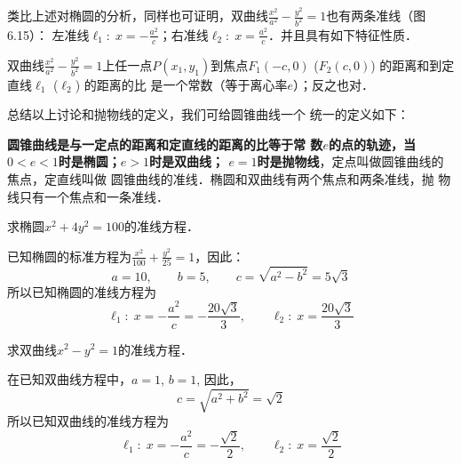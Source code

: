 \begin{figure}[htp]
    \centering
{}
    \caption{}
\end{figure}

类比上述对椭圆的分析，同样也可证明，双曲线$\frac{x^2}{a^2}-\frac{y^2}{b^2}=1$也有两条准线（图6.15）：
左准线$\ell_1:\; x=-\frac{a^2}{c}$；右准线$\ell_2:\; x=\frac{a^2}{c}$．并且具有如下特征性质．

双曲线$\frac{x^2}{a^2}-\frac{y^2}{b^2}=1$上任一点$P(x_1,y_1)$到焦点$F_1(-c,
0)$ ($F_2(c,0)$) 的距离和到定直线$\ell_1$ ($\ell_2$) 的距离的比
是一个常数（等于离心率$e$）；反之也对．

总结以上讨论和抛物线的定义，我们可给圆锥曲线一个
统一的定义如下：

\textbf{圆锥曲线是与一定点的距离和定直线的距离的比等于常
数$e$的点的轨迹，当$0<e<1$时是椭圆；$e>1$时是双曲线；
$e=1$时是抛物线}，定点叫做圆锥曲线的焦点，定直线叫做
圆锥曲线的准线．椭圆和双曲线有两个焦点和两条准线，抛
物线只有一个焦点和一条准线．

\begin{example}
    求椭圆$x^2+4y^2=100$的准线方程．
\end{example}

\begin{solution}
    已知椭圆的标准方程为$\frac{x^2}{100}+\frac{y^2}{25}=1$，因此：
\[a=10,\qquad b=5,\qquad c=\sqrt{a^2-b^2}=5\sqrt{3}\]
所以已知椭圆的准线方程为
\[\ell_1:\; x=-\frac{a^2}{c}=-\frac{20\sqrt{3}}{3},\qquad \ell_2:\; x=\frac{20\sqrt{3}}{3}\]
\end{solution}

\begin{example}
    求双曲线$x^2-y^2=1$的准线方程．
\end{example}



\begin{solution}
在已知双曲线方程中，$a=1$, $b=1$, 因此，
\[c=\sqrt{a^2+b^2}=\sqrt{2}\]
所以已知双曲线的准线方程为
\[\ell_1:\; x=-\frac{a^2}{c}=-\frac{\sqrt{2}}{2},\qquad  \ell_2:\; x=\frac{\sqrt{2}}{2}\]
\end{solution}

